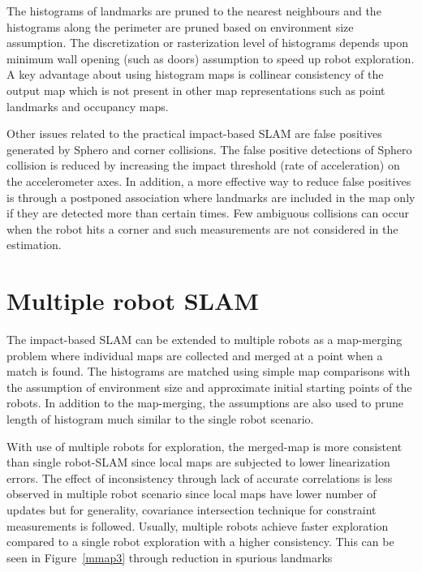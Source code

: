 The histograms of landmarks are pruned to the nearest neighbours and the histograms along the perimeter are pruned based on environment size assumption. The discretization or rasterization level of histograms depends upon minimum wall opening (such as doors) assumption to speed up robot exploration. A key advantage about using histogram maps is collinear consistency of the output map which is not present in other map representations such as point landmarks and occupancy maps.

Other issues related to the practical impact-based SLAM are false positives generated by Sphero and corner collisions. The false positive detections of Sphero collision is reduced by increasing the impact threshold (rate of acceleration) on the accelerometer axes. In addition, a more effective way to reduce false positives is through a postponed association where landmarks are included in the map only if they are detected more than certain times. Few ambiguous collisions can occur when the robot hits a corner and such measurements are not considered in the estimation.

\section{Multiple robot SLAM}	\label{sec::map_merge}
The impact-based SLAM can be extended to multiple robots as a map-merging problem where individual maps are collected and merged at a point when a match is found. The histograms are matched using simple map comparisons with the assumption of environment size and approximate initial starting points of the robots. In addition to the map-merging, the assumptions are also used to prune length of histogram much similar to the single robot scenario.

With use of multiple robots for exploration, the merged-map is more consistent than single robot-SLAM since local maps are subjected to lower linearization errors. The effect of inconsistency through lack of accurate correlations is less observed in multiple robot scenario since local maps have lower number of updates but for generality, covariance intersection technique for constraint measurements is followed. Usually, multiple robots achieve faster exploration compared to a single robot exploration with a higher consistency. This can be seen in Figure~\ref{mmap3} through reduction in spurious landmarks

